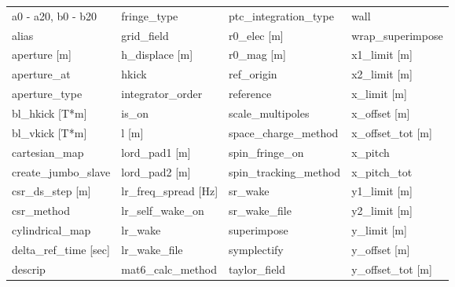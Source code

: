  \begin{tabular}{llll} \toprule
a0 - a20, b0 - b20               & fringe_type                      & ptc_integration_type             & wall                             \\
alias                            & grid_field                       & r0_elec [m]                      & wrap_superimpose                 \\
aperture [m]                     & h_displace [m]                   & r0_mag [m]                       & x1_limit [m]                     \\
aperture_at                      & hkick                            & ref_origin                       & x2_limit [m]                     \\
aperture_type                    & integrator_order                 & reference                        & x_limit [m]                      \\
bl_hkick [T*m]                   & is_on                            & scale_multipoles                 & x_offset [m]                     \\
bl_vkick [T*m]                   & l [m]                            & space_charge_method              & x_offset_tot [m]                 \\
cartesian_map                    & lord_pad1 [m]                    & spin_fringe_on                   & x_pitch                          \\
create_jumbo_slave               & lord_pad2 [m]                    & spin_tracking_method             & x_pitch_tot                      \\
csr_ds_step [m]                  & lr_freq_spread [Hz]              & sr_wake                          & y1_limit [m]                     \\
csr_method                       & lr_self_wake_on                  & sr_wake_file                     & y2_limit [m]                     \\
cylindrical_map                  & lr_wake                          & superimpose                      & y_limit [m]                      \\
delta_ref_time [sec]             & lr_wake_file                     & symplectify                      & y_offset [m]                     \\
descrip                          & mat6_calc_method                 & taylor_field                     & y_offset_tot [m]                 \\

\end{tabular}
